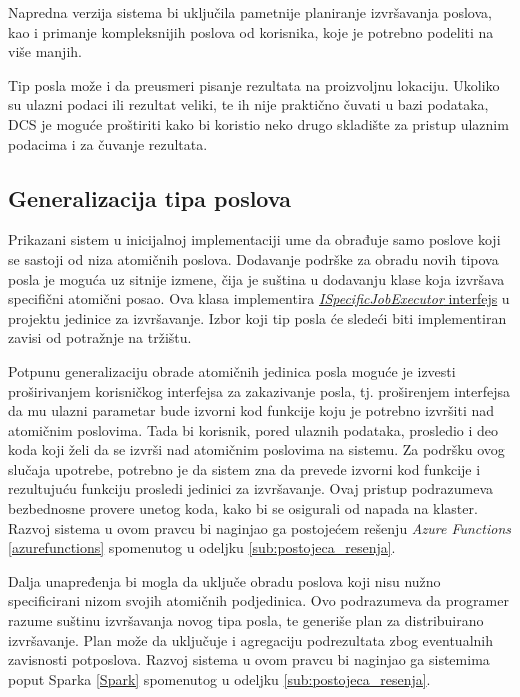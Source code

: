 \documentclass[12pt,oneside]{memoir}
\begin{document}
Napredna verzija sistema bi uključila pametnije planiranje izvršavanja poslova, kao i primanje kompleksnijih poslova od korisnika, koje je potrebno podeliti na više manjih.

Tip posla može i da preusmeri pisanje rezultata na proizvoljnu lokaciju.
Ukoliko su ulazni podaci ili rezultat veliki, te ih nije praktično čuvati u bazi podataka, DCS je moguće proštiriti kako bi koristio neko drugo skladište za pristup ulaznim podacima i za čuvanje rezultata.


\subsection{Generalizacija tipa poslova}

Prikazani sistem u inicijalnoj implementaciji ume da obrađuje samo poslove koji se sastoji od niza atomičnih poslova. Dodavanje podrške za obradu novih tipova posla je moguća uz sitnije izmene, čija je suština u dodavanju klase koja izvršava specifični atomični posao. Ova klasa implementira \href{https://github.com/milana-kovacevic/DistributedComputationSystem/blob/main/src/ComputeNode/Executors/ISpecificJobExecutor.cs}{\emph{ISpecificJobExecutor} interfejs} u projektu jedinice za izvršavanje. Izbor koji tip posla će sledeći biti implementiran zavisi od potražnje na tržištu.

Potpunu generalizaciju obrade atomičnih jedinica posla moguće je izvesti proširivanjem korisničkog interfejsa za zakazivanje posla, tj. proširenjem interfejsa da mu ulazni parametar bude izvorni kod funkcije koju je potrebno izvršiti nad atomičnim poslovima. Tada bi korisnik, pored ulaznih podataka, prosledio i deo koda koji želi da se izvrši nad atomičnim poslovima na sistemu. Za podršku ovog slučaja upotrebe, potrebno je da sistem zna da prevede izvorni kod funkcije i rezultujuću funkciju prosledi jedinici za izvršavanje. Ovaj pristup podrazumeva bezbednosne provere unetog koda, kako bi se osigurali od napada na klaster. Razvoj sistema u ovom pravcu bi naginjao ga postojećem rešenju \emph{Azure Functions} \ref{azurefunctions} spomenutog u odeljku \ref{sub:postojeca_resenja}.

Dalja unapređenja bi mogla da uključe obradu poslova koji nisu nužno specificirani nizom svojih atomičnih podjedinica. Ovo podrazumeva da programer razume suštinu izvršavanja novog tipa posla, te generiše plan za distribuirano izvršavanje. Plan može da uključuje i agregaciju podrezultata zbog eventualnih zavisnosti potposlova. Razvoj sistema u ovom pravcu bi naginjao ga sistemima poput Sparka \ref{Spark} spomenutog u odeljku \ref{sub:postojeca_resenja}.
\end{document}
